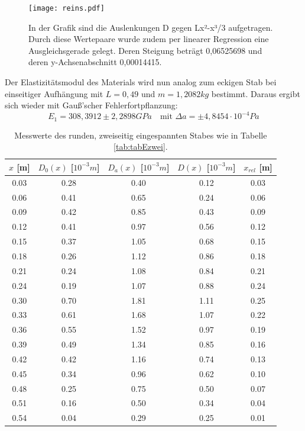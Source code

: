 \documentclass[titlepage = firstcover]{scrartcl}
\begin{document}

      \begin{figure}[h]
        \centering
        \texttt{[image: reins.pdf]}
        \caption{In der Grafik sind die Auslenkungen D gegen Lx²-x³/3 aufgetragen. Durch diese Wertepaare wurde zudem per linearer Regression eine Ausgleichsgerade gelegt. Deren Steigung beträgt 0,06525698 und deren y-Achsenabschnitt 0,00014415.}
        \label{fig:graphReins}
      \end{figure}

      Der Elastizitätsmodul des Materials wird nun analog zum eckigen Stab bei einseitiger Aufhängung mit $L = 0,49 $ und $m = 1,2082 kg$ bestimmt. Daraus ergibt sich wieder mit Gauß'scher Fehlerfortpflanzung:
      \begin{equation*}
        E_1 = 308,3912 \pm 2,2898 GPa \quad \text{mit } \Delta a = \pm 4,8454 \cdot 10^{-4} Pa
      \end{equation*}


      \begin{table}[h]
        \centering
        \caption{Messwerte des runden, zweiseitig eingespannten Stabes wie in Tabelle \ref{tab:tabEzwei}.}
        \label{tab:tabRzwei}
        \begin{tabular}{c c c c c}
          \toprule
          {$x$ [m]} & {$D_0(x)$ [$10^{-3}m$]} & {$D_a(x)$ [$10^{-3}m$]} & {$D(x)$ [$10^{-3}m$]} & {$x_{rel}$ [m]}\\
          \midrule
          0.03 & 0.28 & 0.40 & 0.12 & 0.03\\
          0.06 & 0.41 & 0.65 & 0.24 & 0.06\\
          0.09 & 0.42 & 0.85 & 0.43 & 0.09\\
          0.12 & 0.41 & 0.97 & 0.56 & 0.12\\
          0.15 & 0.37 & 1.05 & 0.68 & 0.15\\
          0.18 & 0.26 & 1.12 & 0.86 & 0.18\\
          0.21 & 0.24 & 1.08 & 0.84 & 0.21\\
          0.24 & 0.19 & 1.07 & 0.88 & 0.24\\
          0.30 & 0.70 & 1.81 & 1.11 & 0.25\\
          0.33 & 0.61 & 1.68 & 1.07 & 0.22\\
          0.36 & 0.55 & 1.52 & 0.97 & 0.19\\
          0.39 & 0.49 & 1.34 & 0.85 & 0.16\\
          0.42 & 0.42 & 1.16 & 0.74 & 0.13\\
          0.45 & 0.34 & 0.96 & 0.62 & 0.10\\
          0.48 & 0.25 & 0.75 & 0.50 & 0.07\\
          0.51 & 0.16 & 0.50 & 0.34 & 0.04\\
          0.54 & 0.04 & 0.29 & 0.25 & 0.01\\
          \bottomrule            
        \end{tabular}
      \end{table}
\end{document}
